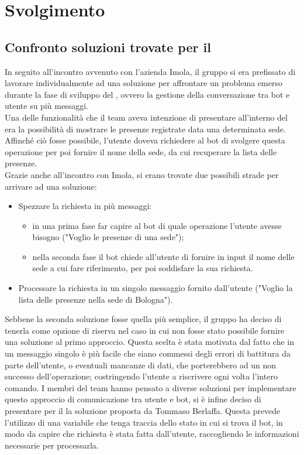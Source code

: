 \section{Svolgimento}
\subsection{Confronto soluzioni trovate per il }
In seguito all'incontro avvenuto con l'azienda Imola, il gruppo si era prefissato di lavorare individualmente ad una soluzione per affrontare un problema emerso durante la fase di sviluppo del , ovvero la gestione della conversazione tra bot e utente su più messaggi. \\
Una delle funzionalità che il team aveva intenzione di presentare all'interno del  era la possibilità di mostrare le presenze registrate data una determinata sede. 
Affinché ciò fosse possibile, l'utente doveva richiedere al bot di svolgere questa operazione per poi fornire il nome della sede, da cui recuperare la lista delle presenze. \\
Grazie anche all'incontro con Imola, si erano trovate due possibili strade per arrivare ad una soluzione:
    \begin{itemize}
        \item Spezzare la richiesta in più messaggi: 
        \begin{itemize}
          \item in una prima fase far capire al bot di quale operazione l'utente avesse bisogno ("Voglio le presenze di una sede");
          \item nella seconda fase il bot chiede all'utente di fornire in input il nome delle sede a cui fare riferimento, per poi soddisfare la sua richiesta.
        \end{itemize}
        \item Processare la richiesta in un singolo messaggio fornito dall'utente ("Voglio la lista delle presenze nella sede di Bologna").
    \end{itemize}
Sebbene la seconda soluzione fosse quella più semplice, il gruppo ha deciso di tenerla come opzione di riserva nel caso in cui non fosse stato possibile fornire una soluzione al primo approccio. 
Questa scelta è stata motivata dal fatto che in un messaggio singolo è più facile che siano commessi degli errori di battitura da parte dell'utente, o eventuali mancanze di dati, che porterebbero ad un non successo dell'operazione; costringendo l'utente a riscrivere ogni volta l'intero comando. 
\newline
I membri del team hanno pensato a diverse soluzioni per implementare questo approccio di comunicazione tra utente e bot, si è infine deciso di presentare per il  la soluzione proposta da Tommaso Berlaffa. 
Questa prevede l'utilizzo di una variabile che tenga traccia dello stato in cui si trova il bot, in modo da capire che richiesta è stata fatta dall'utente, raccogliendo le informazioni necessarie per processarla. 

